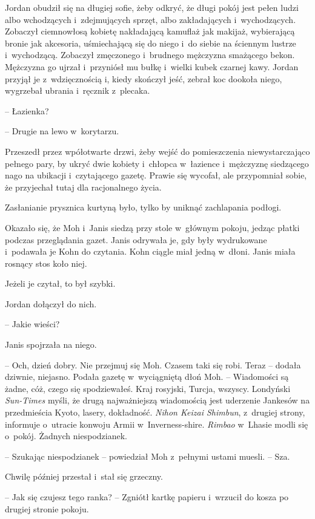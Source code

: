 \documentclass[oneside,polish,11pt,sfheadings]{mwbk}
\begin{document}
Jordan obudził się na długiej sofie, żeby odkryć, że długi pokój jest
pełen ludzi albo wchodzących i~zdejmujących sprzęt, albo zakładających i~wychodzących. Zobaczył ciemnowłosą kobietę nakładającą kamuflaż jak
makijaż, wybierającą bronie jak akcesoria, uśmiechającą się do niego i~do siebie na ściennym lustrze i~wychodzącą. Zobaczył zmęczonego i~brudnego mężczyzna smażącego bekon. Mężczyzna go ujrzał i~przyniósł mu
bułkę i~wielki kubek czarnej kawy. Jordan przyjął je z~wdzięcznością i,
kiedy skończył jeść, zebrał koc dookoła niego, wygrzebał ubrania i~ręcznik z~plecaka.

-- Łazienka?

-- Drugie na lewo w~korytarzu.

Przeszedł przez wpółotwarte drzwi, żeby wejść do pomieszczenia
niewystarczająco pełnego pary, by ukryć dwie kobiety i~chłopca w~łazience i~mężczyznę siedzącego nago na ubikacji i~czytającego gazetę.
Prawie się wycofał, ale przypomniał sobie, że przyjechał tutaj dla
racjonalnego życia.

Zasłanianie prysznica kurtyną było, tylko by uniknąć zachlapania
podłogi.

Okazało się, że Moh i~Janis siedzą przy stole w~głównym pokoju, jedząc
płatki podczas przeglądania gazet. Janis odrywała je, gdy były
wydrukowane i~podawała je Kohn do czytania. Kohn ciągle miał jedną w~dłoni. Janis miała rosnący stos koło niej.

Jeżeli je czytał, to był szybki.

Jordan dołączył do nich.

-- Jakie wieści?

Janis spojrzała na niego.

-- Och, dzień dobry. Nie przejmuj się Moh. Czasem taki się robi. Teraz -- dodała dziwnie, niejasno. Podała gazetę w~wyciągniętą dłoń Moh. -- Wiadomości są żadne, cóż, czego się spodziewałeś. Kraj rosyjski, Turcja,
wszyscy. Londyński \emph{Sun-Times} myśli, że drugą najważniejszą
wiadomością jest uderzenie Jankesów na przedmieścia Kyoto, lasery,
dokładność. \emph{Nihon Keizai Shimbun}, z~drugiej strony, informuje o~utracie konwoju Armii w~Inverness-shire. \emph{Rimbao} w~Lhasie modli
się o~pokój. Żadnych niespodzianek.

-- Szukając niespodzianek -- powiedział Moh z~pełnymi ustami muesli. -- Sza.

Chwilę później przestał i~stał się grzeczny. 

-- Jak się czujesz tego
ranka? -- Zgniótł kartkę papieru i~wrzucił do kosza po drugiej stronie
pokoju.
\end{document}
